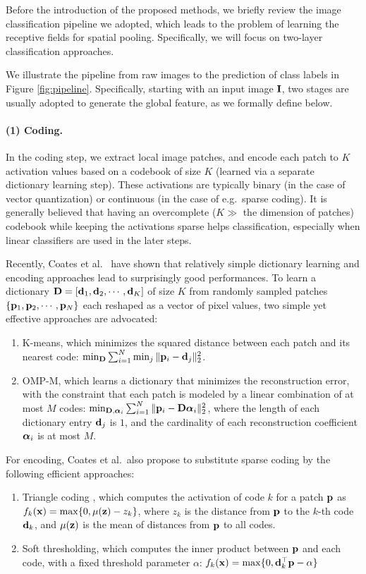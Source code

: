 Before the introduction of the proposed methods, we briefly review the image classification pipeline we adopted, which leads to the problem of learning the receptive fields for spatial pooling. Specifically, we will focus on two-layer classification approaches.

We illustrate the pipeline from raw images to the prediction of class labels in Figure \ref{fig:pipeline}. Specifically, starting with an input image $\mathbf{I}$, two stages are usually adopted to generate the global feature, as we formally define below.

\paragraph{(1) Coding.} In the coding step, we extract local image patches, and encode each patch to $K$ activation values based on a codebook of size $K$ (learned via a separate dictionary learning step). These activations are typically binary (in the case of vector quantization) or continuous (in the case of e.g.\ sparse coding). It is generally believed that having an overcomplete ($K \gg$ the dimension of patches) codebook while keeping the activations sparse helps classification, especially when linear classifiers are used in the later steps.

Recently, Coates et al.~\cite{coates2011icml} have shown that relatively simple dictionary learning and encoding approaches lead to surprisingly good performances. To learn a dictionary $\mathbf{D} =[\mathbf{d}_1,\mathbf{d}_2,\cdots,\mathbf{d}_K]$ of size $K$ from randomly sampled patches $\{\mathbf{p}_1,\mathbf{p}_2,\cdots,\mathbf{p}_N\}$ each reshaped as a vector of pixel values, two simple yet effective approaches are advocated:
\begin{enumerate}
  \item K-means, which minimizes the squared distance between each patch and its nearest code: $\min_{\mathbf{D}} \sum_{i=1}^{N}\min_{j}\|\mathbf{p}_i - \mathbf{d}_j\|_2^2$.
  \item OMP-M, which learns a dictionary that minimizes the reconstruction error, with the constraint that each patch is modeled by a linear combination of at most $M$ codes: $\min_{\mathbf{D},\boldsymbol{\alpha}_{i}} \sum_{i=1}^{N}\|\mathbf{p}_i-\mathbf{D}\boldsymbol{\alpha}_i\|^{2}_{2}$, where the length of each dictionary entry $\mathbf{d}_j$ is $1$, and the cardinality of each reconstruction coefficient $\boldsymbol{\alpha}_i$ is at most $M$.
\end{enumerate}
For encoding, Coates et al.\ also propose to substitute sparse coding by the following efficient approaches:
\begin{enumerate}
  \item Triangle coding \cite{coates2010aistats}, which computes the activation of code $k$ for a patch $\mathbf{p}$ as $f_k(\mathbf{x}) = \max\{0,\mu(\mathbf{z}) - z_k\}$, where $z_k$ is the distance from $\mathbf{p}$ to the $k$-th code $\mathbf{d}_k$, and $\mu(\mathbf{z})$ is the mean of distances from $\mathbf{p}$ to all codes. 
  \item Soft thresholding, which computes the inner product between $\mathbf{p}$ and each code, with a fixed threshold parameter $\alpha$: $f_{k}(\mathbf{x}) = \max\{0, \mathbf{d}_k^\top\mathbf{p} - \alpha\}$
\end{enumerate}

